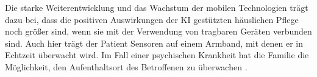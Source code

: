 Die starke Weiterentwicklung und das Wachstum der mobilen Technologien trägt dazu bei, dass die positiven Auswirkungen der KI gestützten häuslichen Pflege noch größer sind, wenn sie mit der Verwendung von tragbaren Geräten verbunden sind. Auch hier trägt der Patient Sensoren auf einem Armband, mit denen er in Echtzeit überwacht wird. Im Fall einer psychischen Krankheit hat die Familie die Möglichkeit, den Aufenthaltsort des Betroffenen zu überwachen \cite{Chapter_14}.